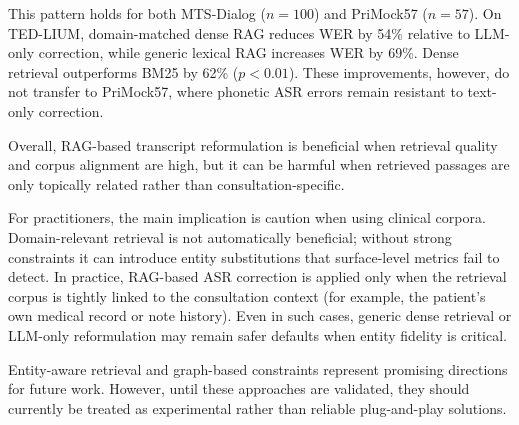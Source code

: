 \documentclass[11pt,a4paper,twocolumn]{article}
\begin{document}
This pattern holds for both MTS-Dialog ($n{=}100$) and PriMock57 ($n{=}57$). On
TED-LIUM, domain-matched dense RAG reduces WER by 54\% relative to LLM-only
correction, while generic lexical RAG increases WER by 69\%. Dense retrieval
outperforms BM25 by 62\% ($p < 0.01$). These improvements, however, do not
transfer to PriMock57, where phonetic ASR errors remain resistant to text-only
correction.

Overall, RAG-based transcript reformulation is beneficial when retrieval
quality and corpus alignment are high, but it can be harmful when retrieved
passages are only topically related rather than consultation-specific.

For practitioners, the main implication is caution when using clinical
corpora. Domain-relevant retrieval is not automatically beneficial; without
strong constraints it can introduce entity substitutions that surface-level
metrics fail to detect. In practice, RAG-based ASR correction is applied
only when the retrieval corpus is tightly linked to the consultation context
(for example, the patient's own medical record or note history). Even in such
cases, generic dense retrieval or LLM-only reformulation may remain safer
defaults when entity fidelity is critical.

Entity-aware retrieval and graph-based constraints represent promising
directions for future work. However, until these approaches are validated,
they should currently be treated as experimental rather than reliable
plug-and-play solutions.


\vspace{4pt}
\end{document}
